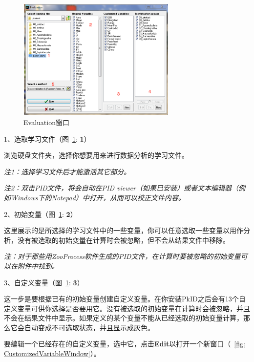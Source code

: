 \documentclass[12pt]{article}
\begin{document}
\begin{figure}[!ht]
\centering
\includegraphics[width=0.7\textwidth]{EvaluationWindow.eps}
\caption{Evaluation窗口}
\label{fig: EvaluationWindow}
\end{figure} 

1、选取学习文件（图~\ref{fig: EvaluationWindow}: {\color{red}\textbf{1}}）

浏览硬盘文件夹，选择你想要用来进行数据分析的学习文件。

{\color{blue}\textit{注1：选择学习文件后才能激活其它部分。}}

{\color{blue}\textit{注2：双击PID文件，将会自动在PID viewer（如果已安装）或者文本编辑器（例如Windows下的Notepad）中打开，从而可以校正文件内容。}}

2、初始变量（图~\ref{fig: EvaluationWindow}: {\color{red}\textbf{2}}）

这里展示的是所选择的学习文件中的一些变量，你可以任意选取一些变量以用作分析，没有被选取的初始变量在计算时会被忽略，但不会从结果文件中移除。

{\color{blue}\textit{注：对于那些用ZooProcess软件生成的PID文件，在计算时要被忽略的初始变量可以在附件中找到。}}

3、自定义变量（图~\ref{fig: EvaluationWindow}: {\color{red}\textbf{3}}）

这一步是要根据已有的初始变量创建自定义变量。在你安装PkID之后会有13个自定义变量可供你选择是否要用它。没有被选取的初始变量在计算时会被忽略，并且不会在结果文件中显示。如果定义的某个变量不能从已经选取的初始变量计算，那么它会自动变成不可选取状态，并且显示成灰色。

要编辑一个已经存在的自定义变量，选中它，点击\textbf{Edit}以打开一个新窗口（~\ref{fig: CustomizedVariableWindow}）。
\end{document}
